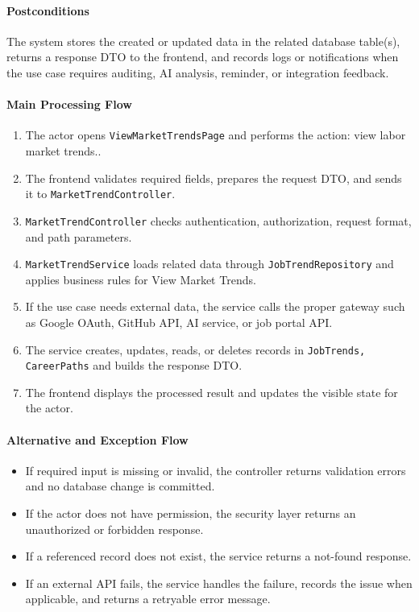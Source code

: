\paragraph{Postconditions}

The system stores the created or updated data in the related database table(s), returns a response DTO to the frontend, and records logs or notifications when the use case requires auditing, AI analysis, reminder, or integration feedback.

\paragraph{Main Processing Flow}

\begin{enumerate}
    \item The actor opens \texttt{ViewMarketTrendsPage} and performs the action: view labor market trends..
    \item The frontend validates required fields, prepares the request DTO, and sends it to \texttt{MarketTrendController}.
    \item \texttt{MarketTrendController} checks authentication, authorization, request format, and path parameters.
    \item \texttt{MarketTrendService} loads related data through \texttt{JobTrendRepository} and applies business rules for View Market Trends.
    \item If the use case needs external data, the service calls the proper gateway such as Google OAuth, GitHub API, AI service, or job portal API.
    \item The service creates, updates, reads, or deletes records in \texttt{JobTrends, CareerPaths} and builds the response DTO.
    \item The frontend displays the processed result and updates the visible state for the actor.
\end{enumerate}

\paragraph{Alternative and Exception Flow}

\begin{itemize}
    \item If required input is missing or invalid, the controller returns validation errors and no database change is committed.
    \item If the actor does not have permission, the security layer returns an unauthorized or forbidden response.
    \item If a referenced record does not exist, the service returns a not-found response.
    \item If an external API fails, the service handles the failure, records the issue when applicable, and returns a retryable error message.
\end{itemize}

